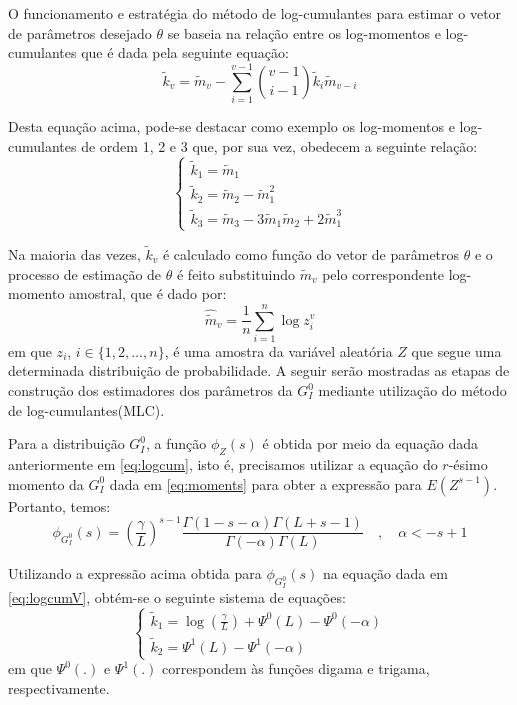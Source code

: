 \documentclass[12pt]{article}
\begin{document}
O funcionamento e estratégia do método de log-cumulantes para estimar o vetor de parâmetros desejado $\theta$ se baseia na relação entre os log-momentos e log-cumulantes que é dada pela seguinte equação:
\begin{equation}
    \tilde{k}_{v} = \tilde{m}_{v} - \sum_{i=1}^{v-1}\binom{v-1}{i-1}\tilde{k}_{i}\tilde{m}_{v-i}
\end{equation}

Desta equação acima, pode-se destacar como exemplo os log-momentos e log-cumulantes de ordem 1, 2 e 3 que, por sua vez, obedecem a seguinte relação:
\begin{equation}
    \left\{\begin{matrix}
        \tilde{k}_{1} = \tilde{m}_{1} \\ 
        \tilde{k}_{2} = \tilde{m}_{2} - \tilde{m}_{1}^{2} \\
        \tilde{k}_{3} = \tilde{m}_{3} - 3\tilde{m}_{1}\tilde{m}_{2} + 2\tilde{m}_{1}^{3} 
    \end{matrix}\right.
    \label{eq:logcum123}
\end{equation}

Na maioria das vezes, $\tilde{k}_{v}$ é calculado como função do vetor de parâmetros $\theta$ e o processo de estimação de $\theta$ é feito substituindo $\tilde{m}_{v}$ pelo correspondente log-momento amostral, que é dado por:
\begin{equation}
    \widehat{\tilde{m}}_{v} = \frac{1}{n}\sum_{i=1}^{n}\log z_{i}^{v}
    \label{eq:log_momAmostrais}
\end{equation}
em que $z_i$, $i \in \{1, 2, \dots, n\}$, é uma amostra da variável aleatória $Z$ que segue uma determinada distribuição de probabilidade. A seguir serão mostradas as etapas de construção dos estimadores dos parâmetros da $G_I^0$ mediante utilização do método de log-cumulantes(MLC). 

Para a distribuição $G_I^0$, a função $\phi_{Z}(s)$ é obtida por meio da equação dada anteriormente em \eqref{eq:logcum}, isto é, precisamos utilizar a equação do $r$-ésimo momento da $G_I^0$ dada em \eqref{eq:moments} para obter a expressão para $E(Z^{s-1})$. Portanto, temos:
\begin{equation}
    \phi_{G_I^0}(s) = \left ( \frac{\gamma}{L} \right )^{s-1}\frac{\Gamma(1-s-\alpha)\Gamma(L+s-1)}{\Gamma(-\alpha)\Gamma(L)} \quad , \quad \alpha < -s+1
\end{equation}

Utilizando a expressão acima obtida para $\phi_{G_I^0}(s)$ na equação dada em \eqref{eq:logcumV}, obtém-se o seguinte sistema de equações:
\begin{equation}
    \left\{\begin{matrix}
        \tilde{k}_{1} = \log \left ( \frac{\gamma}{L} \right ) + \Psi^{0}(L) - \Psi^{0}(-\alpha)  \\ 
        \tilde{k}_{2} = \Psi^{1}(L) - \Psi^{1}(-\alpha)
    \end{matrix}\right.
\end{equation}
em que $\Psi^{0}(.)$ e $\Psi^{1}(.)$ correspondem às funções digama e trigama, respectivamente.
\end{document}
